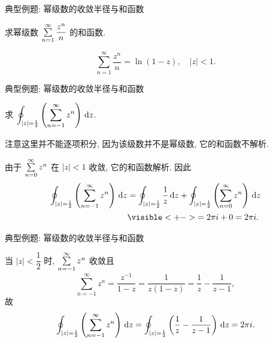 \begin{frame}{典型例题: 幂级数的收敛半径与和函数}
\begin{exercise}
求幂级数 $\sum\limits_{n=1}^\infty\dfrac{z^n}n$ 的和函数.
\end{exercise}
\begin{answer}
\[\sum_{n=1}^\infty\frac{z^n}n=\ln(1-z),\quad|z|<1.\]
\end{answer}
\end{frame}


\begin{frame}{典型例题: 幂级数的收敛半径与和函数}
\begin{example}
求 $\displaystyle\oint_{|z|=\frac12}\left(\sum_{n=-1}^\infty z^n\right)\,\mathrm{d} z$.
\end{example}
\onslide<+->
注意这里并不能逐项积分, 因为该级数并不是幂级数, 它的和函数不解析.
\begin{solution}
由于 $\sum\limits_{n=0}^\infty z^n$ 在 $|z|<1$ 收敛,
\onslide<+->
它的和函数解析.
\onslide<+->
因此
\begin{align*}
\oint_{|z|=\frac12}\left(\sum_{n=-1}^\infty z^n\right)\diff z
	&=\oint_{|z|=\frac12}\frac1z\diff z+\oint_{|z|=\frac12}\left(\sum_{n=0}^\infty z^n\right)\diff z\\
&\visible<+->{=2\pi i+0=2\pi i.}
\end{align*}
\end{solution}
\end{frame}


\begin{frame}{典型例题: 幂级数的收敛半径与和函数}
\beqskip{3pt}
\begin{conclusion}[另解]
当 $|z|<\dfrac12$ 时, $\sum\limits_{n=-1}^\infty z^n$ 收敛且
\[\sum_{n=-1}^\infty z^n=\frac{z^{-1}}{1-z}=\frac1{z(1-z)}=\frac1z-\frac1{z-1},\]
\onslide<+->
故
\[\oint_{|z|=\frac12}\left(\sum_{n=-1}^\infty z^n\right)\,\mathrm{d} z
=\oint_{|z|=\frac12}\left(\frac1z-\frac1{z-1}\right)\,\mathrm{d} z=2\pi i.\]
\end{conclusion}
\endgroup
\end{frame}

